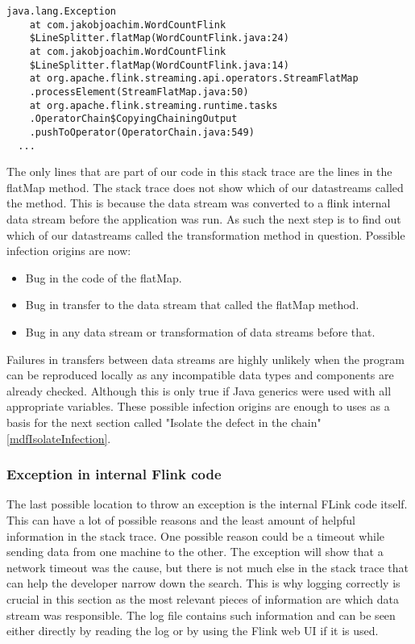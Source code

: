 \begin{lstlisting}[caption={Exception in Transformation}]
java.lang.Exception
    at com.jakobjoachim.WordCountFlink
    $LineSplitter.flatMap(WordCountFlink.java:24)
    at com.jakobjoachim.WordCountFlink
    $LineSplitter.flatMap(WordCountFlink.java:14)
    at org.apache.flink.streaming.api.operators.StreamFlatMap
    .processElement(StreamFlatMap.java:50)
    at org.apache.flink.streaming.runtime.tasks
    .OperatorChain$CopyingChainingOutput
    .pushToOperator(OperatorChain.java:549)
  ...
\end{lstlisting}

The only lines that are part of our code in this stack trace are the lines in the flatMap method. The stack trace does not show which of our datastreams called the method. This is because the data stream was converted to a flink internal data stream before the application was run. As such the next step is to find out which of our datastreams called the transformation method in question. Possible infection origins are now:

\begin{itemize}
  \item Bug in the code of the flatMap.
  \item Bug in transfer to the data stream that called the flatMap method.
  \item Bug in any data stream or transformation of data streams before that.
\end{itemize}

Failures in transfers between data streams are highly unlikely when the program can be reproduced locally as any incompatible data types and components are already checked. Although this is only true if Java generics were used with all appropriate variables. These possible infection origins are enough to uses as a basis for the next section called "Isolate the defect in the chain" \ref{mdfIsolateInfection}.

\subsubsection{Exception in internal Flink code}
The last possible location to throw an exception is the internal FLink code itself. This can have a lot of possible reasons and the least amount of helpful information in the stack trace. One possible reason could be a timeout while sending data from one machine to the other. The exception will show that a network timeout was the cause, but there is not much else in the stack trace that can help the developer narrow down the search. This is why logging correctly is crucial in this section as the most relevant pieces of information are which data stream was responsible. The log file contains such information and can be seen either directly by reading the log or by using the Flink web UI if it is used.

